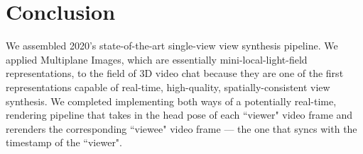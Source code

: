 \section{Conclusion}\label{sec:conclusion}

We assembled 2020’s state-of-the-art single-view view synthesis pipeline. We applied Multiplane Images, which are essentially mini-local-light-field representations, to the field of 3D video chat because they are one of the first representations capable of real-time, high-quality, spatially-consistent view synthesis. We completed implementing both ways of a potentially real-time, rendering pipeline that takes in the head pose of each ``viewer" video frame and rerenders the corresponding ``viewee" video frame --- the one that syncs with the timestamp of the ``viewer".
